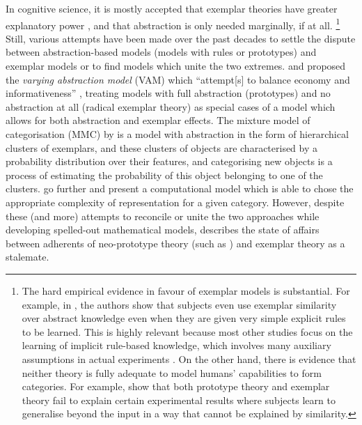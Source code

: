 In cognitive science, it is mostly accepted that exemplar theories have greater explanatory power \citep[184]{Vanpaemel2016}, and that abstraction is only needed marginally, if at all.%
\footnote{The hard empirical evidence in favour of exemplar models is substantial.
  For example, in \cite{HahnEa2010}, the authors show that subjects even use exemplar similarity over abstract knowledge even when they are given very simple explicit rules to be learned.
  This is highly relevant because most other studies focus on the learning of implicit rule-based knowledge, which involves many auxiliary assumptions in actual experiments \citep[2]{HahnEa2010}.
On the other hand, there is evidence that neither theory is fully adequate to model humans' capabilities to form categories.
For example, \cite{ConawayKurtz2016} show that both prototype theory and exemplar theory fail to explain certain experimental results where subjects learn to generalise beyond the input in a way that cannot be explained by similarity.
}
Still, various attempts have been made over the past decades to settle the dispute between abstraction-based models (models with rules or prototypes) and exemplar models or to find models which unite the two extremes.
\cite{VanpaemelStorms2008} and \citet{LeeVanpaemel2008} proposed the \textit{varying abstraction model} (VAM) which ``attempt[s] to balance economy and informativeness'' \citep[745]{LeeVanpaemel2008}, treating models with full abstraction (prototypes) and no abstraction at all (radical exemplar theory) as special cases of a model which allows for both abstraction and exemplar effects.
The mixture model of categorisation (MMC) by \cite{Rosseel2002} is a model with abstraction in the form of hierarchical clusters of exemplars, and these clusters of objects are characterised by a probability distribution over their features, and categorising new objects is a process of estimating the probability of this object belonging to one of the clusters.
\cite{GriffithsEa2009} go further and present a computational model which is able to chose the appropriate complexity of representation for a given category.
However, despite these (and more) attempts to reconcile or unite the two approaches while developing spelled-out mathematical models, \cite[183--184]{Vanpaemel2016} describes the state of affairs between adherents of neo-prototype theory (such as \citealp{MindaSmith2001,MindaSmith2002}) and exemplar theory as a stalemate.


